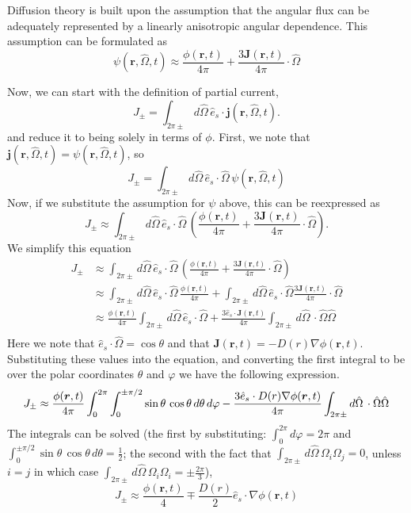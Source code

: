 \documentclass{article}
\newcommand{\Oh}{\hat{\Omega}}
\newcommand{\cur}{\bm{J}}
\newcommand{\rt}{(\bm{r},t)}
\newcommand{\rOt}{(\bm{r},\Oh,t)}
\begin{document}

Diffusion theory is built upon the assumption that the angular flux can be adequately represented by a linearly anisotropic angular dependence. This assumption can be formulated as
$$\psi\rOt \approx \frac{\phi\rt}{4\pi} + \frac{3\cur\rt}{4\pi}\cdot \Oh$$

Now, we can start with the definition of partial current,
$$ J_{\pm} = \int_{2\pi\pm} d\Oh \, \hat{e}_s \cdot \bm{j}\rOt .$$
and reduce it to being solely in terms of $\phi$. First, we note that $\bm{j}\rOt = \psi\rOt$, so
$$ J_{\pm} = \int_{2\pi\pm} d\Oh \, \hat{e}_s \cdot \Oh \, \psi\rOt $$
Now, if we substitute the assumption for $\psi$ above, this can be reexpressed as
$$ J_{\pm} \approx \int_{2\pi\pm} d\Oh \, \hat{e}_s \cdot \Oh \, \left(\frac{\phi\rt}{4\pi} + \frac{3\cur\rt}{4\pi}\cdot \Oh\right) .$$
We simplify this equation
\begin{align*}
J_{\pm}	&\approx \int_{2\pi\pm} d\Oh \, \hat{e}_s \cdot \Oh \, \left(\frac{\phi\rt}{4\pi} + \frac{3\cur\rt}{4\pi}\cdot \Oh\right) \\
		&\approx \int_{2\pi\pm} d\Oh \, \hat{e}_s \cdot \Oh \, \frac{\phi\rt}{4\pi} + \int_{2\pi\pm} d\Oh \, \hat{e}_s \cdot \Oh \frac{3\cur\rt}{4\pi}\cdot \Oh \\
		&\approx \frac{\phi\rt}{4\pi} \int_{2\pi\pm} d\Oh \, \hat{e}_s \cdot \Oh + \frac{3\hat{e}_s \cdot \cur\rt}{4\pi} \int_{2\pi\pm} d\Oh \, \cdot \Oh\Oh \\
\end{align*}
Here we note that $\hat{e}_s \cdot \Oh = \cos\theta$ and that $\cur\rt = -D(r)\nabla\phi\rt$. Substituting these values into the equation, and converting the first integral to be over the polar coordinates $\theta$ and $\varphi$ we have the following expression.
$$ J_{\pm} \approx \frac{\phi\rt}{4\pi} \int_{0}^{2\pi}\int_{0}^{\pm\pi/2} \sin\theta \, \cos\theta \, d\theta \, d\varphi - \frac{3\hat{e}_s\cdot D(r)\nabla\phi\rt}{4\pi} \int_{2\pi\pm} d\Oh \, \cdot \Oh\Oh \\$$
The integrals can be solved (the first by substituting: $\int_{0}^{2\pi}d\varphi = 2\pi$ and $\int_{0}^{\pm\pi/2}\sin\theta \, \cos\theta \, d\theta = \frac{1}{2}$; the second with the fact that $\int_{2\pi\pm} d\Oh \, \Omega_i\Omega_j = 0$, unless $i=j$ in which case $\int_{2\pi\pm} d\Oh \, \Omega_i\Omega_i = \pm\frac{2\pi}{3}$),
$$ J_{\pm} \approx \frac{\phi\rt}{4} \mp \frac{D(r)}{2}\hat{e}_s \cdot \nabla\phi\rt$$






\end{document}
